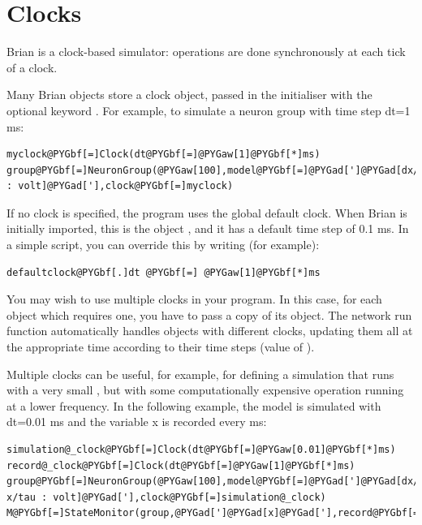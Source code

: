 \documentclass[letterpaper,10pt,english]{manual}
\begin{document}
\resetcurrentobjects
\hypertarget{--doc-clocks}{}

\hypertarget{index-2}{}\section{Clocks}

Brian is a clock-based simulator: operations are done synchronously at each tick of a clock.

Many Brian objects store a clock object, passed in the initialiser with the optional keyword .
For example, to simulate a neuron group with time step dt=1 ms:

\begin{Verbatim}[commandchars=@\[\]]
myclock@PYGbf[=]Clock(dt@PYGbf[=]@PYGaw[1]@PYGbf[*]ms)
group@PYGbf[=]NeuronGroup(@PYGaw[100],model@PYGbf[=]@PYGad[']@PYGad[dx/dt=1*mV/ms : volt]@PYGad['],clock@PYGbf[=]myclock)
\end{Verbatim}

If no clock is specified, the program uses the global default clock. When Brian is initially
imported, this is the object \hyperlink{brian.defaultclock}{}, and it has a default
time step of 0.1 ms. In a simple script, you can override this by writing (for example):

\begin{Verbatim}[commandchars=@\[\]]
defaultclock@PYGbf[.]dt @PYGbf[=] @PYGaw[1]@PYGbf[*]ms
\end{Verbatim}

You may wish to use multiple clocks in your program. In this case,
for each object which requires one, you have to pass a copy of its
\hyperlink{brian.Clock}{} object. The network run function automatically handles objects
with different clocks, updating them all at the appropriate time
according to their time steps (value of \hyperlink{brian.Clock.dt}{}).

Multiple clocks can be useful, for example, for defining a simulation
that runs with a very small , but with some computationally
expensive operation running at a lower frequency. In the following example, the model
is simulated with dt=0.01 ms and the variable x is recorded every ms:

\begin{Verbatim}[commandchars=@\[\]]
simulation@_clock@PYGbf[=]Clock(dt@PYGbf[=]@PYGaw[0.01]@PYGbf[*]ms)
record@_clock@PYGbf[=]Clock(dt@PYGbf[=]@PYGaw[1]@PYGbf[*]ms)
group@PYGbf[=]NeuronGroup(@PYGaw[100],model@PYGbf[=]@PYGad[']@PYGad[dx/dt=-x/tau : volt]@PYGad['],clock@PYGbf[=]simulation@_clock)
M@PYGbf[=]StateMonitor(group,@PYGad[']@PYGad[x]@PYGad['],record@PYGbf[=]@PYGad[']@PYGad[True]@PYGad['],clock@PYGbf[=]record@_clock)
\end{Verbatim}
\end{document}
